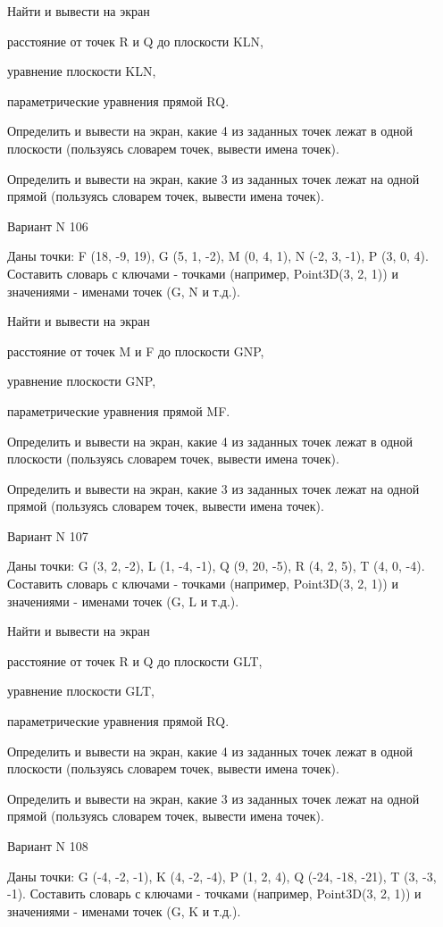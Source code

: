 \documentclass[11pt]{report}
\begin{document}
Найти и вывести на экран


расстояние от точек R и Q до плоскости KLN,


уравнение плоскости KLN,


параметрические уравнения прямой RQ.


Определить и вывести на экран, какие 4 из заданных точек лежат в одной плоскости (пользуясь словарем точек, вывести имена точек).


Определить и вывести на экран, какие 3 из заданных точек лежат на одной прямой (пользуясь словарем точек, вывести имена точек).

\newpage
Вариант N 106

Даны точки: F (18, -9, 19), G (5, 1, -2), M (0, 4, 1), N (-2, 3, -1), P (3, 0, 4).
Составить словарь с ключами - точками (например, Point3D(3, 2, 1)) и значениями - именами точек (G, N и т.д.).


Найти и вывести на экран


расстояние от точек M и F до плоскости GNP,


уравнение плоскости GNP,


параметрические уравнения прямой MF.


Определить и вывести на экран, какие 4 из заданных точек лежат в одной плоскости (пользуясь словарем точек, вывести имена точек).


Определить и вывести на экран, какие 3 из заданных точек лежат на одной прямой (пользуясь словарем точек, вывести имена точек).

\newpage
Вариант N 107

Даны точки: G (3, 2, -2), L (1, -4, -1), Q (9, 20, -5), R (4, 2, 5), T (4, 0, -4).
Составить словарь с ключами - точками (например, Point3D(3, 2, 1)) и значениями - именами точек (G, L и т.д.).


Найти и вывести на экран


расстояние от точек R и Q до плоскости GLT,


уравнение плоскости GLT,


параметрические уравнения прямой RQ.


Определить и вывести на экран, какие 4 из заданных точек лежат в одной плоскости (пользуясь словарем точек, вывести имена точек).


Определить и вывести на экран, какие 3 из заданных точек лежат на одной прямой (пользуясь словарем точек, вывести имена точек).

\newpage
Вариант N 108

Даны точки: G (-4, -2, -1), K (4, -2, -4), P (1, 2, 4), Q (-24, -18, -21), T (3, -3, -1).
Составить словарь с ключами - точками (например, Point3D(3, 2, 1)) и значениями - именами точек (G, K и т.д.).
\end{document}
